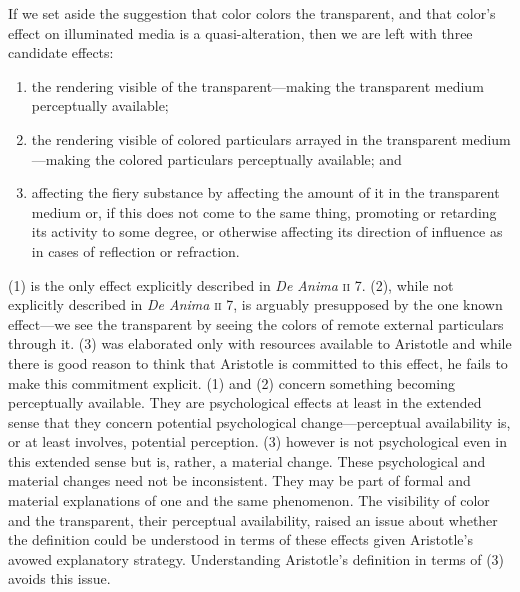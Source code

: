If we set aside the suggestion that color colors the transparent, and that color's effect on illuminated media is a quasi-alteration, then we are left with three candidate effects:
\begin{enumerate}[(1)]
	\item the rendering visible of the transparent---making the transparent medium perceptually available;
	\item the rendering visible of colored particulars arrayed in the transparent medi\-um\----\-making the colored particulars perceptually available; and 
	\item affecting the fiery substance by affecting the amount of it in the transparent medium or, if this does not come to the same thing, promoting or retarding its activity to some degree, or otherwise affecting its direction of influence as in cases of reflection or refraction. 
\end{enumerate}
(1) is the only effect explicitly described in \emph{De Anima} \textsc{ii} 7. (2), while not explicitly described in \emph{De Anima} \textsc{ii} 7, is arguably presupposed by the one known effect---we see the transparent by seeing the colors of remote external particulars through it. (3) was elaborated only with resources available to Aristotle and while there is good reason to think that Aristotle is committed to this effect, he fails to make this commitment explicit. (1) and (2) concern something becoming perceptually available. They are psychological effects at least in the extended sense that they concern potential psychological change---perceptual availability is, or at least involves, potential perception. (3) however is not psychological even in this extended sense but is, rather, a material change. These psychological and material changes need not be inconsistent. They may be part of formal and material explanations of one and the same phenomenon. The visibility of color and the transparent, their perceptual availability, raised an issue about whether the definition could be understood in terms of these effects given Aristotle's avowed explanatory strategy. Understanding Aristotle's definition in terms of (3) avoids this issue.

